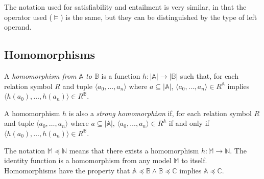 		The notation used for satisfiability and entailment is very similar, in
		that the operator used ($\models$) is the same, but they can be
		distinguished by the type of left operand.

	\subsection{Homomorphisms}

		A \emph{homomorphism from $\mathbb{A}$ to $\mathbb{B}$} is a function
		$h: |\mathbb{A}|\to|\mathbb{B}|$ such that, for each relation symbol
		$R$ and tuple $\langle a_0 , \ldots , a_n \rangle$ where $a \subseteq
		|\mathbb{A}|$, $\langle a_0 , \ldots , a_n  \rangle \in R^\mathbb{A}$
		implies $\langle h(a_0) , \ldots , h(a_n) \rangle \in R^\mathbb{B}$.


		A homomorphism $h$ is also a \emph{strong homomorphism} if, for each
		relation symbol $R$ and tuple $\langle a_0 , \ldots , a_n \rangle$
		where $a \subseteq |\mathbb{A}|$, $\langle a_0 , \ldots , a_n  \rangle
		\in R^\mathbb{A}$ if and only if $\langle h(a_0) , \ldots , h(a_n)
		\rangle \in R^\mathbb{B}$.

		The notation $\mathbb{M} \preceq \mathbb{N}$ means that there exists a
		homomorphism $h : \mathbb{M} \to \mathbb{N}$. The identity function is
		a homomorphism from any model $\mathbb{M}$ to itself. Homomorphisms
		have the property that $\mathbb{A} \preceq \mathbb{B} \wedge \mathbb{B}
		\preceq \mathbb{C}$ implies $\mathbb{A} \preceq \mathbb{C}$.

